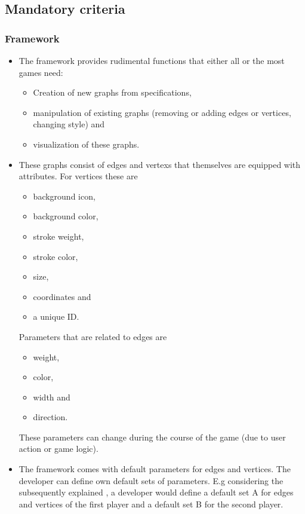 \subsection{Mandatory criteria}\label{REF:MANDATORY-CRITERIA}
\subsubsection{Framework}
\begin{itemize}

	\item The framework provides rudimental functions that either all or the most \glspl{game} need:
	\begin{itemize}
		\item Creation of new \glspl{graph} from specifications,
		\item manipulation of existing graphs (removing or adding edges or vertices, changing style) and 
		\item visualization of these graphs.
	\end{itemize}

	\item These graphs consist of \glspl{edge} and \glspl{vertex} that themselves are equipped with attributes. For vertices these are
	\begin{itemize}
		\item background icon,
		\item background color,
		\item stroke weight,
		\item stroke color,
		\item size,
		\item coordinates and
		\item a unique \gls{ID}.
	\end{itemize}
	Parameters that are related to edges are
	\begin{itemize}
		\item weight,
		\item color,
		\item width and
		\item direction.
	\end{itemize}
	These parameters can change during the course of the game (due to user action or game logic).

	\item The framework comes with default parameters for edges and vertices. The developer can define own default sets of parameters. E.g considering the subsequently explained {\twixt}, a developer would define a default set A for edges and vertices of the first player and a default set B for the second player.


\end{itemize}
